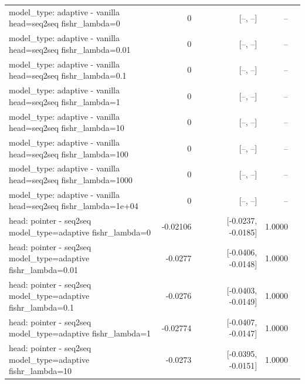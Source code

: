 \documentclass[10pt]{article}
\makeatletter
\newcommand{\stackcell}[1]{\begin{tabular}[t]{@{}l@{}}#1\end{tabular}}
\makeatother
\begin{document}
{\begin{longtable}{lrrrl}
\stackcell{model\_type: adaptive - vanilla\\\footnotesize head=seq2seq fishr\_lambda=0 } & 0 & [--, --] & -- & \\
\stackcell{model\_type: adaptive - vanilla\\\footnotesize head=seq2seq fishr\_lambda=0.01 } & 0 & [--, --] & -- & \\
\stackcell{model\_type: adaptive - vanilla\\\footnotesize head=seq2seq fishr\_lambda=0.1 } & 0 & [--, --] & -- & \\
\stackcell{model\_type: adaptive - vanilla\\\footnotesize head=seq2seq fishr\_lambda=1 } & 0 & [--, --] & -- & \\
\stackcell{model\_type: adaptive - vanilla\\\footnotesize head=seq2seq fishr\_lambda=10 } & 0 & [--, --] & -- & \\
\stackcell{model\_type: adaptive - vanilla\\\footnotesize head=seq2seq fishr\_lambda=100 } & 0 & [--, --] & -- & \\
\stackcell{model\_type: adaptive - vanilla\\\footnotesize head=seq2seq fishr\_lambda=1000 } & 0 & [--, --] & -- & \\
\stackcell{model\_type: adaptive - vanilla\\\footnotesize head=seq2seq fishr\_lambda=1e+04 } & 0 & [--, --] & -- & \\
\stackcell{head: pointer - seq2seq\\\footnotesize model\_type=adaptive fishr\_lambda=0 } & -0.02106 & [-0.0237, -0.0185] & 1.0000 & \\
\stackcell{head: pointer - seq2seq\\\footnotesize model\_type=adaptive fishr\_lambda=0.01 } & -0.0277 & [-0.0406, -0.0148] & 1.0000 & \\
\stackcell{head: pointer - seq2seq\\\footnotesize model\_type=adaptive fishr\_lambda=0.1 } & -0.0276 & [-0.0403, -0.0149] & 1.0000 & \\
\stackcell{head: pointer - seq2seq\\\footnotesize model\_type=adaptive fishr\_lambda=1 } & -0.02774 & [-0.0407, -0.0147] & 1.0000 & \\
\stackcell{head: pointer - seq2seq\\\footnotesize model\_type=adaptive fishr\_lambda=10 } & -0.0273 & [-0.0395, -0.0151] & 1.0000 & \\

\end{longtable}}
\end{document}
